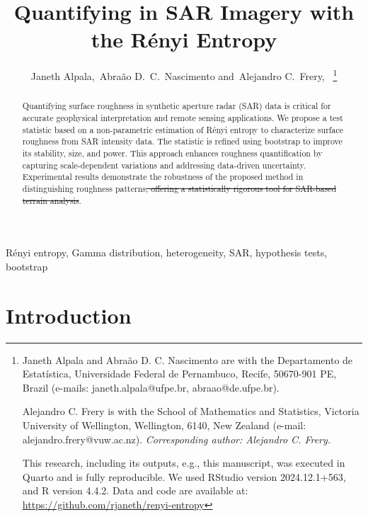 \documentclass[
  lettersize  journal,
]{IEEEtran}%
\title{Quantifying \DIFdelbegin \DIFdel{Roughness }\DIFdelend \DIFaddbegin \DIFadd{Heterogeneity }\DIFaddend in SAR Imagery with the Rényi Entropy}
\author{
Janeth Alpala\orcidlink{0000-0002-0265-6236},~Abraão
D.~C.~Nascimento\orcidlink{0000-0003-2673-219X}
and~Alejandro
C.~Frery\orcidlink{0000-0002-8002-5341},~\IEEEmembership{Fellow, IEEE}%
\DIFdelbegin %
\DIFdelend \DIFaddbegin \thanks{Janeth Alpala and Abraão D. C. Nascimento are with the
Departamento de Estatística, Universidade Federal de Pernambuco, Recife,
50670-901 PE, Brazil (e-mails: janeth.alpala@ufpe.br,
abraao@de.ufpe.br).

Alejandro C. Frery is with the School of Mathematics and Statistics,
Victoria University of Wellington, Wellington, 6140, New Zealand
(e-mail: alejandro.frery@vuw.ac.nz).
\emph{Corresponding author: Alejandro C. Frery.}

This research, including its outputs, e.g., this manuscript, was
executed in Quarto and is fully reproducible. We used RStudio version
2024.12.1+563, and R version 4.4.2. Data and code are available at:
\url{https://github.com/rjaneth/renyi-entropy}}
\DIFaddend }
\renewcommand*\tablename{Table}
\newcommand\tablename{Table}
\providecommand{\DIFdeltex}[1]{{\protect\color{red}\sout{#1}}} %
\providecommand{\DIFdelbegin}{} %
\providecommand{\DIFdelend}{} %
\providecommand{\DIFdel}[1]{\texorpdfstring{\DIFdeltex{#1}}{}} %
\newcommand{\DIFscaledelfig}{0.5}
\newlength{\DIFdelgraphicswidth} %
\newlength{\DIFdelgraphicsheight} %
\newcommand{\DIFdelincludegraphics}[2][]{%
\sbox{\DIFdelgraphicsbox}{\DIFOincludegraphics[#1]{#2}}%
\settoboxwidth{\DIFdelgraphicswidth}{\DIFdelgraphicsbox} %
\settoboxtotalheight{\DIFdelgraphicsheight}{\DIFdelgraphicsbox} %
\scalebox{\DIFscaledelfig}{%
\parbox[b]{\DIFdelgraphicswidth}{\usebox{\DIFdelgraphicsbox}\\[-\baselineskip] \rule{\DIFdelgraphicswidth}{0em}}\llap{\resizebox{\DIFdelgraphicswidth}{\DIFdelgraphicsheight}{%
\setlength{\unitlength}{\DIFdelgraphicswidth}%
\begin{picture}(1,1)%
\thicklines\linethickness{2pt} %
{\color[rgb]{1,0,0}\put(0,0){\framebox(1,1){}}}%
{\color[rgb]{1,0,0}\put(0,0){\line( 1,1){1}}}%
{\color[rgb]{1,0,0}\put(0,1){\line(1,-1){1}}}%
\end{picture}%
}\hspace*{3pt}}} %
} %
\DeclareRobustCommand{\DIFdelbegin}{\DIFOdelbegin \let\includegraphics\DIFdelincludegraphics} %
\DeclareRobustCommand{\DIFdelend}{\DIFOaddend \let\includegraphics\DIFOincludegraphics} %
\begin{document}


\maketitle

\begin{abstract}
Quantifying surface roughness in synthetic aperture radar (SAR) data is
critical for accurate geophysical interpretation and remote sensing
applications. We propose a test statistic based on a non-parametric
estimation of Rényi entropy to characterize surface roughness from SAR
intensity data. The statistic is refined using bootstrap to improve its
stability, size, and power. This approach enhances roughness
quantification by capturing scale-dependent variations and addressing
data-driven uncertainty. Experimental results demonstrate the robustness
of the proposed method in distinguishing roughness patterns\DIFdelbegin \DIFdel{, offering a
statistically rigorous tool for SAR-based terrain analysis}\DIFdelend .
\end{abstract}
\begin{IEEEkeywords}
Rényi entropy, Gamma distribution, heterogeneity, SAR, hypothesis
tests, bootstrap
\end{IEEEkeywords}

%


\renewcommand{\tablename}{TABLE}

\section{Introduction}\label{introduction}
\end{document}
